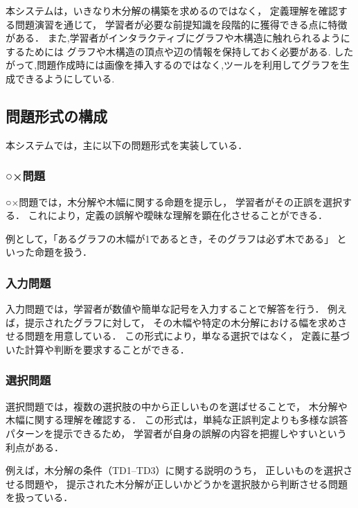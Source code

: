 \documentclass[paper]{ieicej}
\begin{document}
本システムは，いきなり木分解の構築を求めるのではなく，
定義理解を確認する問題演習を通じて，
学習者が必要な前提知識を段階的に獲得できる点に特徴がある．
また,学習者がインタラクティブにグラフや木構造に触れられるようにするためには
グラフや木構造の頂点や辺の情報を保持しておく必要がある.
したがって,問題作成時には画像を挿入するのではなく,ツールを利用してグラフを生成できるようにしている.

\subsection{問題形式の構成}
本システムでは，主に以下の問題形式を実装している．

\subsubsection{○×問題}
○×問題では，木分解や木幅に関する命題を提示し，
学習者がその正誤を選択する．
これにより，定義の誤解や曖昧な理解を顕在化させることができる．

例として，「あるグラフの木幅が1であるとき，そのグラフは必ず木である」
といった命題を扱う．

\subsubsection{入力問題}
入力問題では，学習者が数値や簡単な記号を入力することで解答を行う．
例えば，提示されたグラフに対して，
その木幅や特定の木分解における幅を求めさせる問題を用意している．
この形式により，単なる選択ではなく，
定義に基づいた計算や判断を要求することができる．

\subsubsection{選択問題}
選択問題では，複数の選択肢の中から正しいものを選ばせることで，
木分解や木幅に関する理解を確認する．
この形式は，単純な正誤判定よりも多様な誤答パターンを提示できるため，
学習者が自身の誤解の内容を把握しやすいという利点がある．

例えば，木分解の条件（TD1--TD3）に関する説明のうち，
正しいものを選択させる問題や，
提示された木分解が正しいかどうかを選択肢から判断させる問題を扱っている．
\end{document}
